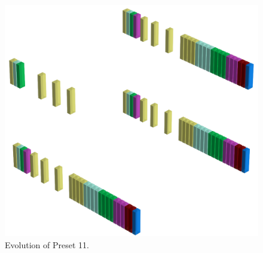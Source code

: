\clearpage                                                                 
\begin{figure}[H]                                                          
  \centering                                                             
  \begin{adjustbox}{width=14cm,center}                                   
  \includegraphics[width=14cm]{src/presets/pattern10-45.png}%
  \end{adjustbox}                                                        
\caption{Evolution of Preset 11.}                                           
\end{figure}                                                               
\clearpage                                                                 
                                                                           
